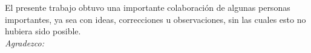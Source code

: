 \cleardoublepage


\begin{acknowledgements}
	\vspace*{2cm}
El presente trabajo obtuvo una importante colaboración de algunas personas importantes, ya sea con ideas, correcciones u observaciones, sin las cuales esto no hubiera sido posible.\\[2cm]
\textit{Agradezco:}\\[2cm]
\textit{
	\vspace*{-0.4cm}
\blindenumerate[10]
}
\vspace*{1cm}
 
\end{acknowledgements}

